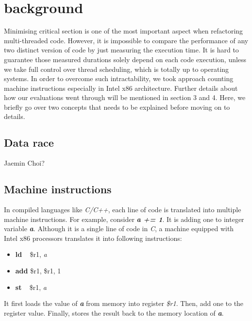\section{background}

Minimising critical section is one of the most important aspect when refactoring multi-threaded code. However, it is impossible to compare the performance of any two distinct version of code by just measuring the execution time. It is hard to guarantee those measured durations solely depend on each code execution, unless we take full control over thread scheduling, which is totally up to operating systems. In order to overcome such intractability, we took approach counting machine instructions especially in Intel x86 architecture. Further details about how our evaluations went through will be mentioned in section 3 and 4. Here, we briefly go over two concepts that needs to be explained before moving on to details.

\subsection{Data race}
Jaemin Choi?

\subsection{Machine instructions}
In compiled languages like \textit{C/C++}, each line of code is translated into multiple machine instructions. For example, consider \textbf{\textit{a += 1}}. It is adding one to integer variable \textbf{\textit{a}}. Although it is a single line of code in \textit{C}, a machine equipped with Intel x86 processors translates it into following instructions:
\begin{itemize}
	\item[] \textbf{ld} \,\,\, \$r1, \textit{a}
	\item[] \textbf{add} \$r1, \$r1, 1
	\item[] \textbf{st} \,\,\, \$r1, \textit{a}
\end{itemize}

It first loads the value of \textbf{\textit{a}} from memory into register \textit{\$r1}. Then, add one to the register value. Finally, stores the result back to the memory location of \textbf{\textit{a}}. 